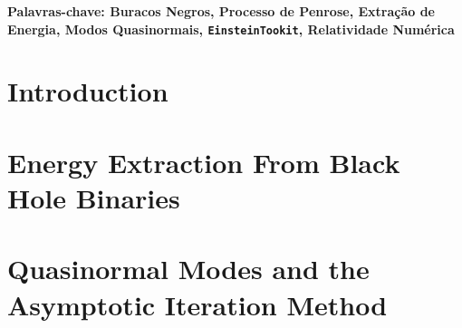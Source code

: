 \documentclass[12pt, twoside]{report}
\newcommand\myclearpage{\cleartooddpage[\thispagestyle{empty}]}
\begin{document}

\textbf{\textportuguese{Palavras-chave: Buracos Negros, Processo de Penrose, Extração de Energia, Modos Quasinormais, \texttt{EinsteinTookit}, Relatividade Numérica}}

\begin{center}
  {\large{}\thispagestyle{empty}}{\large\par}
  \par\end{center}

\begin{center}
  \myclearpage
  \par\end{center}


\setcounter{page}{13}

\tableofcontents{}

\begin{center}
  {\large{}\thispagestyle{empty}}{\large\par}
  \par\end{center}


\begin{center}
  \myclearpage
  \par\end{center}


\chapter{Introduction}
\label{ch:introduction}


\myclearpage
\par

\chapter{Energy Extraction From Black Hole Binaries}
\label{ch:penrose_binaries}


\myclearpage
\par

\chapter{Quasinormal Modes and the Asymptotic Iteration Method}
\label{ch:qnm_aim}

\end{document}
